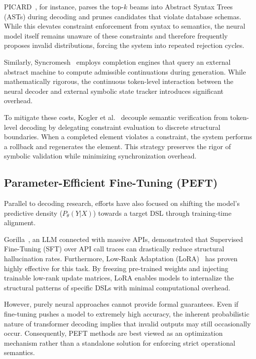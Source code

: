   PICARD~\cite{scholak2021picard}, for instance, parses the top-$k$ beams into
  Abstract Syntax Trees (ASTs) during decoding and prunes candidates that violate
  database schemas. While this elevates constraint enforcement from syntax to
  semantics, the neural model itself remains unaware of these constraints and
  therefore frequently proposes invalid distributions, forcing the system into
  repeated rejection cycles.

  Similarly, Syncromesh~\cite{poesia2022synchromesh} employs completion engines that query an external
  abstract machine to compute admissible continuations during generation. While
  mathematically rigorous, the continuous token-level interaction between the
  neural decoder and external symbolic state tracker introduces significant overhead.

  To mitigate these costs, Kogler et al.~\cite{kogler2026towards} decouple semantic verification
  from token-level decoding by delegating constraint evaluation to discrete
  structural boundaries. When a completed element violates a constraint, the
  system performs a rollback and regenerates the element.
  This strategy preserves the rigor of symbolic validation while minimizing
  synchronization overhead.

  \subsection{Parameter-Efficient Fine-Tuning (PEFT)}
  Parallel to decoding research, efforts have also focused on shifting the
  model's predictive density ($P_\theta(Y|X)$) towards a target DSL through
  training-time alignment.

  Gorilla~\cite{patil2024gorilla}, an LLM connected with massive APIs, demonstrated that Supervised Fine-Tuning (SFT)
  over API call traces can drastically reduce structural hallucination rates.
  Furthermore, Low-Rank Adaptation (LoRA)~\cite{hu2022lora} has proven highly effective for
  this task. By freezing pre-trained weights and injecting trainable low-rank
  update matrices, LoRA enables models to internalize the structural patterns of
  specific DSLs with minimal computational overhead.

  However, purely neural approaches cannot provide formal guarantees. Even if
  fine-tuning pushes a model to extremely high accuracy, the inherent
  probabilistic nature of transformer decoding implies that invalid outputs may
  still occasionally occur. Consequently, PEFT methods are best viewed as an
  optimization mechanism rather than a standalone solution for enforcing strict
  operational semantics.

